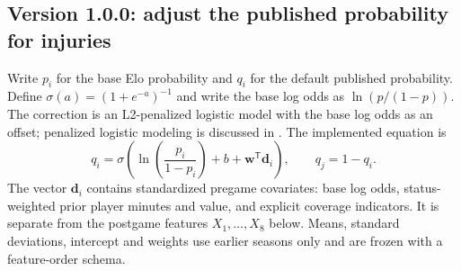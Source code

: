 \documentclass[11pt]{article}
\begin{document}
\subsection{Version 1.0.0: adjust the published probability for injuries}
Write $p_i$ for the base Elo probability and $q_i$ for the default published
probability. Define $\sigma(a)=(1+e^{-a})^{-1}$ and write the base log odds as $\ln(p/(1-p))$. The correction is an L2-penalized logistic model with the base log odds
as an offset; penalized logistic modeling is discussed in
\cite[Sections 4.4 and 5.5]{esl}. The implemented equation is
\begin{equation}\label{eq:injury}
 \boxed{q_i=\sigma\!\left(\ln\!\left(\frac{p_i}{1-p_i}\right)+b+
 \mathbf w^{\mathsf T}\mathbf d_i\right)},\qquad q_j=1-q_i.
\end{equation}
The vector $\mathbf d_i$ contains standardized pregame covariates: base log
odds, status-weighted prior player minutes and value, and explicit coverage
indicators. It is separate from the postgame features $X_1,\ldots,X_8$ below.
Means, standard deviations, intercept and weights use earlier seasons only
and are frozen with a feature-order schema.
\end{document}
